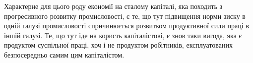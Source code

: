 Характерне для цього роду економії на сталому капіталі,
яка походить з прогресивного розвитку промисловості, є те,
що тут підвищення норми зиску в одній галузі промисловості
спричинюється розвитком продуктивної сили праці в іншій галузі.
Те, що тут іде на користь капіталістові, є знов таки вигода,
яка є продуктом суспільної праці, хоч і не продуктом робітників,
експлуатованих безпосередньо самим цим капіталістом.
\parbreak{}  %
